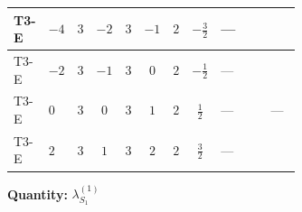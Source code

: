 \documentclass[8pt]{article}
\begin{document}
\begin{landscape}
\begin{longtable}{@{}llcccccc >{\raggedright\arraybackslash}p{0.21\linewidth} >{\raggedright\arraybackslash}p{0.21\linewidth} >{\raggedright\arraybackslash}p{0.21\linewidth}@{}}
\midrule
T3-E & $-4$ & $3$ & $-2$ & $3$ & $-1$ & $2$ & $-\frac{3}{2}$ & --- & \scriptsize\adjustbox{max width=\linewidth}{$\begin{gathered} -3 \operatorname{Tr}\!\left({y_1}\,\left({y_1}\right)^{\dagger}\,{y_1}\,\left({y_1}\right)^{\dagger}\right)\end{gathered}$} & \scriptsize\adjustbox{max width=\linewidth}{$\begin{gathered} +192 {g_1}^4\end{gathered}$} \\
\midrule
T3-E & $-2$ & $3$ & $-1$ & $3$ & $0$ & $2$ & $-\frac{1}{2}$ & --- & \scriptsize\adjustbox{max width=\linewidth}{$\begin{gathered} -3 \operatorname{Tr}\!\left({y_1}\,\left({y_1}\right)^{\dagger}\,{y_1}\,\left({y_1}\right)^{\dagger}\right)\end{gathered}$} & \scriptsize\adjustbox{max width=\linewidth}{$\begin{gathered} +12 {g_1}^4\end{gathered}$} \\
\midrule
T3-E & $0$ & $3$ & $0$ & $3$ & $1$ & $2$ & $\frac{1}{2}$ & --- & \scriptsize\adjustbox{max width=\linewidth}{$\begin{gathered} -3 \operatorname{Tr}\!\left({y_1}\,\left({y_1}\right)^{\dagger}\,{y_1}\,\left({y_1}\right)^{\dagger}\right)\end{gathered}$} & --- \\
\midrule
T3-E & $2$ & $3$ & $1$ & $3$ & $2$ & $2$ & $\frac{3}{2}$ & --- & \scriptsize\adjustbox{max width=\linewidth}{$\begin{gathered} -3 \operatorname{Tr}\!\left({y_1}\,\left({y_1}\right)^{\dagger}\,{y_1}\,\left({y_1}\right)^{\dagger}\right)\end{gathered}$} & \scriptsize\adjustbox{max width=\linewidth}{$\begin{gathered} +12 {g_1}^4\end{gathered}$} \\
\midrule
\bottomrule
\end{longtable}
\clearpage
\noindent\textbf{Quantity: }$\lambda_{S_1}^{(1)}$\par\smallskip

\end{landscape}
\end{document}

